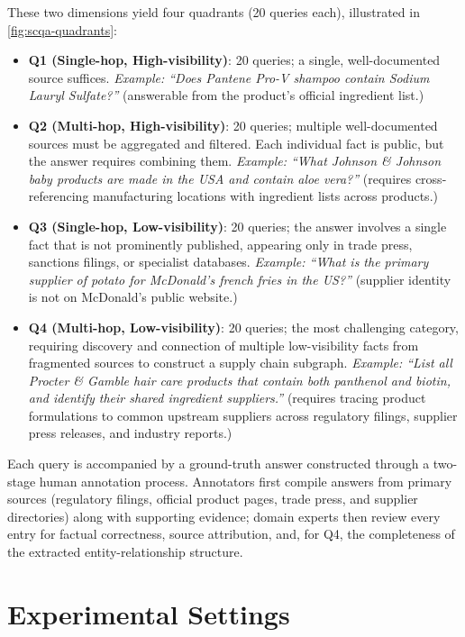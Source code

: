 \documentclass{article}
\begin{document}
These two dimensions yield four quadrants (20 queries each), illustrated in \autoref{fig:scqa-quadrants}:
\begin{itemize}
\item \textbf{Q1 (Single-hop, High-visibility)}: 20 queries; a single, well-documented source suffices. \textit{Example: ``Does Pantene Pro-V shampoo contain Sodium Lauryl Sulfate?''} (answerable from the product's official ingredient list.)
\item \textbf{Q2 (Multi-hop, High-visibility)}: 20 queries; multiple well-documented sources must be aggregated and filtered. Each individual fact is public, but the answer requires combining them. \textit{Example: ``What Johnson \& Johnson baby products are made in the USA and contain aloe vera?''} (requires cross-referencing manufacturing locations with ingredient lists across products.)
\item \textbf{Q3 (Single-hop, Low-visibility)}: 20 queries; the answer involves a single fact that is not prominently published, appearing only in trade press, sanctions filings, or specialist databases. \textit{Example: ``What is the primary supplier of potato for McDonald's french fries in the US?''} (supplier identity is not on McDonald's public website.)
\item \textbf{Q4 (Multi-hop, Low-visibility)}: 20 queries; the most challenging category, requiring discovery and connection of multiple low-visibility facts from fragmented sources to construct a supply chain subgraph. \textit{Example: ``List all Procter \& Gamble hair care products that contain both panthenol and biotin, and identify their shared ingredient suppliers.''} (requires tracing product formulations to common upstream suppliers across regulatory filings, supplier press releases, and industry reports.)
\end{itemize}
Each query is accompanied by a ground-truth answer constructed through a two-stage human annotation process. Annotators first compile answers from primary sources (regulatory filings, official product pages, trade press, and supplier directories) along with supporting evidence; domain experts then review every entry for factual correctness, source attribution, and, for Q4, the completeness of the extracted entity-relationship structure. 




\section{Experimental Settings}
\label{sec:setup}
\end{document}
